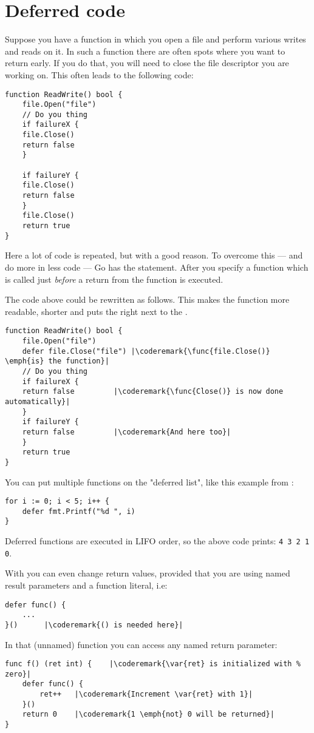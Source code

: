 \section{Deferred code}
Suppose you have a function in which you open a file and perform various
writes and reads on it. In such a function there are often spots where
you want to return early. If you do that, you will need to close the file
descriptor you are working on. This often leads to the following code:
\begin{lstlisting}[caption=Without \func{defer}]
function ReadWrite() bool {
    file.Open("file")
    // Do you thing
    if failureX {
	file.Close()
	return false
    }

    if failureY {
	file.Close()
	return false
    }
    file.Close()
    return true
}
\end{lstlisting}
Here a lot of code is repeated, but with a good reason. To overcome this ---
and do more in less code --- Go has the  statement. After
 you specify a function which is called just \emph{before} a
return from the function is executed.

The code above could be rewritten as follows. This makes the 
function more readable, shorter and puts the  right next 
to the .
\begin{lstlisting}[caption=With \func{defer}]
function ReadWrite() bool {
    file.Open("file")
    defer file.Close("file") |\coderemark{\func{file.Close()} \emph{is} the function}|
    // Do you thing
    if failureX {
	return false	     |\coderemark{\func{Close()} is now done automatically}|
    }
    if failureY {
	return false	     |\coderemark{And here too}|
    }
    return true
}
\end{lstlisting}
You can put multiple functions on the "deferred list", like this
example from \cite{effective_go}:
\begin{lstlisting}
for i := 0; i < 5; i++ { 
    defer fmt.Printf("%d ", i) 
} 
\end{lstlisting}
Deferred functions are executed in LIFO order, so the above code
prints: \lstinline{4 3 2 1 0}. 

With  you can even change return values, provided that
you are using named result parameters and a function literal, i.e:
\begin{lstlisting}[caption=Function literal]
defer func() {
	...
}()		 |\coderemark{() is needed here}|
\end{lstlisting}
In that (unnamed) function you can access any named return
parameter:
\begin{lstlisting}[caption=Access return values within \func{defer}]
func f() (ret int) {    |\coderemark{\var{ret} is initialized with %
zero}|
	defer func() {
		ret++	|\coderemark{Increment \var{ret} with 1}|
	}()
	return 0	|\coderemark{1 \emph{not} 0 will be returned}|
}
\end{lstlisting}


